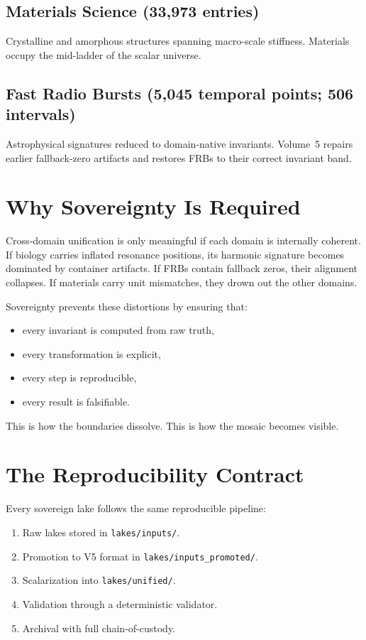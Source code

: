\documentclass[11pt, letterpaper, openany]{book}
\begin{document}
\subsection*{Materials Science (33,973 entries)}
Crystalline and amorphous structures spanning macro-scale stiffness. Materials occupy the mid-ladder
of the scalar universe.

\subsection*{Fast Radio Bursts (5,045 temporal points; 506 intervals)}
Astrophysical signatures reduced to domain-native invariants. Volume~5 repairs earlier fallback-zero
artifacts and restores FRBs to their correct invariant band.

\section*{Why Sovereignty Is Required}
Cross-domain unification is only meaningful if each domain is internally coherent. If biology carries
inflated resonance positions, its harmonic signature becomes dominated by container artifacts. If
FRBs contain fallback zeros, their alignment collapses. If materials carry unit mismatches, they drown
out the other domains.

Sovereignty prevents these distortions by ensuring that:

\begin{itemize}
    \item every invariant is computed from raw truth,
    \item every transformation is explicit,
    \item every step is reproducible,
    \item every result is falsifiable.
\end{itemize}

This is how the boundaries dissolve.  
This is how the mosaic becomes visible.

\section*{The Reproducibility Contract}
Every sovereign lake follows the same reproducible pipeline:

\begin{enumerate}
    \item Raw lakes stored in \texttt{lakes/inputs/}.
    \item Promotion to V5 format in \texttt{lakes/inputs\_promoted/}.
    \item Scalarization into \texttt{lakes/unified/}.
    \item Validation through a deterministic validator.
    \item Archival with full chain-of-custody.
\end{enumerate}
\end{document}
